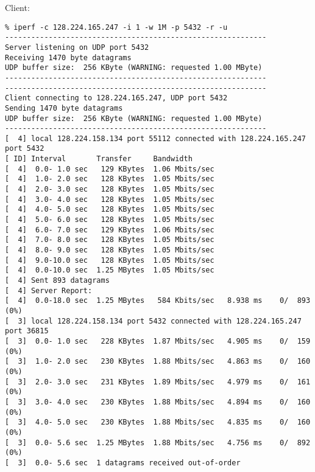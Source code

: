 \documentclass[a4paper]{report}
\begin{document}
Client:
\begin{lstlisting}
% iperf -c 128.224.165.247 -i 1 -w 1M -p 5432 -r -u
------------------------------------------------------------
Server listening on UDP port 5432
Receiving 1470 byte datagrams
UDP buffer size:  256 KByte (WARNING: requested 1.00 MByte)
------------------------------------------------------------
------------------------------------------------------------
Client connecting to 128.224.165.247, UDP port 5432
Sending 1470 byte datagrams
UDP buffer size:  256 KByte (WARNING: requested 1.00 MByte)
------------------------------------------------------------
[  4] local 128.224.158.134 port 55112 connected with 128.224.165.247 port 5432
[ ID] Interval       Transfer     Bandwidth
[  4]  0.0- 1.0 sec   129 KBytes  1.06 Mbits/sec
[  4]  1.0- 2.0 sec   128 KBytes  1.05 Mbits/sec
[  4]  2.0- 3.0 sec   128 KBytes  1.05 Mbits/sec
[  4]  3.0- 4.0 sec   128 KBytes  1.05 Mbits/sec
[  4]  4.0- 5.0 sec   128 KBytes  1.05 Mbits/sec
[  4]  5.0- 6.0 sec   128 KBytes  1.05 Mbits/sec
[  4]  6.0- 7.0 sec   129 KBytes  1.06 Mbits/sec
[  4]  7.0- 8.0 sec   128 KBytes  1.05 Mbits/sec
[  4]  8.0- 9.0 sec   128 KBytes  1.05 Mbits/sec
[  4]  9.0-10.0 sec   128 KBytes  1.05 Mbits/sec
[  4]  0.0-10.0 sec  1.25 MBytes  1.05 Mbits/sec
[  4] Sent 893 datagrams
[  4] Server Report:
[  4]  0.0-18.0 sec  1.25 MBytes   584 Kbits/sec   8.938 ms    0/  893 (0%)
[  3] local 128.224.158.134 port 5432 connected with 128.224.165.247 port 36815
[  3]  0.0- 1.0 sec   228 KBytes  1.87 Mbits/sec   4.905 ms    0/  159 (0%)
[  3]  1.0- 2.0 sec   230 KBytes  1.88 Mbits/sec   4.863 ms    0/  160 (0%)
[  3]  2.0- 3.0 sec   231 KBytes  1.89 Mbits/sec   4.979 ms    0/  161 (0%)
[  3]  3.0- 4.0 sec   230 KBytes  1.88 Mbits/sec   4.894 ms    0/  160 (0%)
[  3]  4.0- 5.0 sec   230 KBytes  1.88 Mbits/sec   4.835 ms    0/  160 (0%)
[  3]  0.0- 5.6 sec  1.25 MBytes  1.88 Mbits/sec   4.756 ms    0/  892 (0%)
[  3]  0.0- 5.6 sec  1 datagrams received out-of-order
\end{lstlisting}
\end{document}
